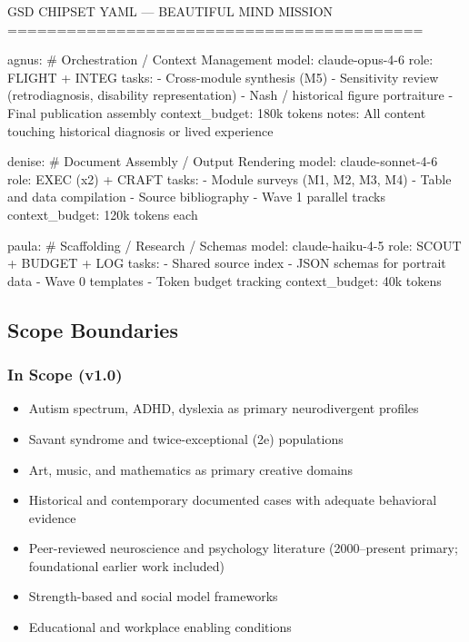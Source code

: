 \documentclass[11pt,letterpaper]{article}
\begin{document}
\begin{asciibox}
GSD CHIPSET YAML — BEAUTIFUL MIND MISSION
==========================================

agnus:        # Orchestration / Context Management
  model: claude-opus-4-6
  role: FLIGHT + INTEG
  tasks:
    - Cross-module synthesis (M5)
    - Sensitivity review (retrodiagnosis, disability representation)
    - Nash / historical figure portraiture
    - Final publication assembly
  context_budget: 180k tokens
  notes: All content touching historical diagnosis or lived experience

denise:       # Document Assembly / Output Rendering
  model: claude-sonnet-4-6
  role: EXEC (x2) + CRAFT
  tasks:
    - Module surveys (M1, M2, M3, M4)
    - Table and data compilation
    - Source bibliography
    - Wave 1 parallel tracks
  context_budget: 120k tokens each

paula:        # Scaffolding / Research / Schemas
  model: claude-haiku-4-5
  role: SCOUT + BUDGET + LOG
  tasks:
    - Shared source index
    - JSON schemas for portrait data
    - Wave 0 templates
    - Token budget tracking
  context_budget: 40k tokens
\end{asciibox}

\subsection{Scope Boundaries}

\subsubsection{In Scope (v1.0)}
\begin{itemize}[leftmargin=*]
  \item Autism spectrum, ADHD, dyslexia as primary neurodivergent profiles
  \item Savant syndrome and twice-exceptional (2e) populations
  \item Art, music, and mathematics as primary creative domains
  \item Historical and contemporary documented cases with adequate behavioral evidence
  \item Peer-reviewed neuroscience and psychology literature (2000--present primary; foundational earlier work included)
  \item Strength-based and social model frameworks
  \item Educational and workplace enabling conditions
\end{itemize}
\end{document}
